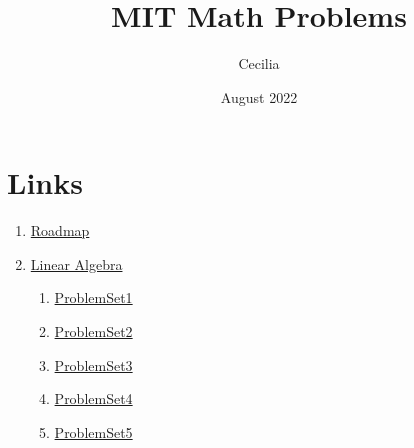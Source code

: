 \documentclass{article}
\title{MIT Math Problems}
\author{Cecilia}
\date{August 2022}
\begin{document}
\maketitle

\section*{Links}
    \begin{enumerate}
        \item \href{https://math.mit.edu/academics/undergrad/roadmaps.php}{Roadmap}
        \item \href{https://ocw.mit.edu/courses/18-700-linear-algebra-fall-2013/}{Linear Algebra}
        \begin{enumerate}
            \item \hyperlink{LinearAlgebra-ProblemSet1.1}{ProblemSet1}
            \item \hyperlink{LinearAlgebra-ProblemSet2.1}{ProblemSet2}
            \item \hyperlink{LinearAlgebra-ProblemSet3.1}{ProblemSet3}
            \item \hyperlink{LinearAlgebra-ProblemSet4.1}{ProblemSet4}
            \item \hyperlink{LinearAlgebra-ProblemSet5.1}{ProblemSet5}
        \end{enumerate}
    \end{enumerate}

%
%

























\end{document}
